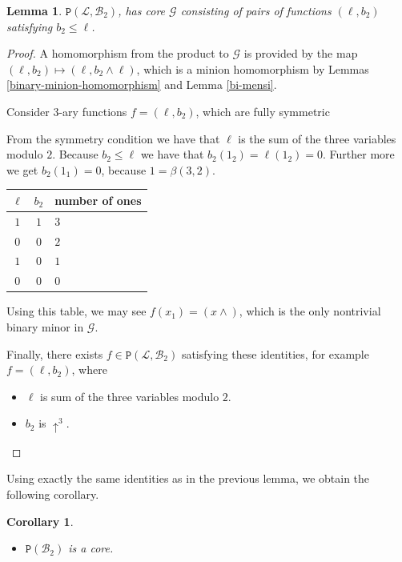 \documentclass{amsart}
\numberwithin{equation}{section}
\theoremstyle{plain}
\newtheorem{lemma}[theorem]{Lemma}
\newtheorem{corollary}[theorem]{Corollary}
\theoremstyle{definition}
\def\clone#1{\mathcal{#1}}
\def\minion#1{\mathcal{#1}}
\def\Bc{\clone{B}}
\def\Lc{\clone{L}}
\def\atleast#1{\uparrow^{#1}}
\def\C#1{{\mathtt{P}}(#1)}
\begin{document}
\begin{lemma}\label{lb2} $\C{\Lc, \Bc_2}$, has core $\minion{G}$ consisting of pairs of functions $(\ell,b_2)$ satisfying $b_2\leq \ell $.
\end{lemma}
\begin{proof}
  A homomorphism from the product to $\minion{G}$ is provided by the map $(\ell,b_2)\mapsto (\ell, b_2\wedge \ell)$, which is a minion homomorphism by Lemmas \ref{binary-minion-homomorphism} and Lemma \ref{bi-mensi}.

Consider $3$-ary functions $f = (\ell, b_2)$, which are fully symmetric

From the symmetry condition we have that $\ell$ is the sum of the three variables modulo $2$. Because $b_2\leq \ell$ we have that $b_2(1_2) = \ell(1_2)=0$. Further more we get $b_2(1_1) = 0$, because $1= \beta(3,2)$.

\begin{center}
\begin{tabular}{ |cc|l } 
 \hline
 $\ell$ & $b_2$ & number of ones \\ 
  \hline
     $1$ & $1$ & $3$ \\ 
     $0$ & $0$ & $2$ \\
     $1$ & $0$ & $1$ \\
     $0$ & $0$ & $0$ \\    
 \hline
\end{tabular}
\end{center}

Using this table, we may see  $f(x_1) = (x{\wedge})$, which is the only nontrivial binary minor in $\minion{G}$. 

Finally, there exists $f\in\C{\Lc, \Bc_2}$ satisfying these identities, for example $f=(\ell,b_2)$, where
\begin{itemize}
\item $\ell$ is sum of the three variables modulo $2$.
\item $b_2$ is $\atleast{3}$.
\end{itemize}
\end{proof}

Using exactly the same identities as in the previous lemma, we obtain
the following corollary.

\begin{corollary}\label{lb2cor}
  \hfill
    \begin{itemize}
        \item $\C{\Bc_2}$ is a core.
    \end{itemize}
\end{corollary}
\end{document}
